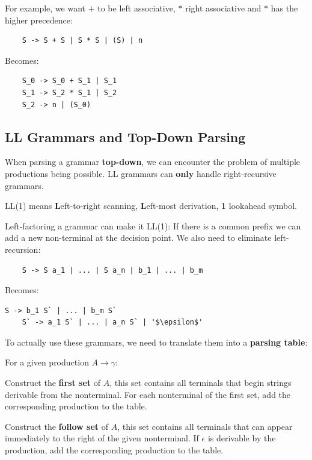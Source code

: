 For example, we want $+$ to be left associative, $*$ right associative and $*$ has the higher precedence:\smallskip
\begin{lstlisting}
	S -> S + S | S * S | (S) | n
\end{lstlisting} \smallskip

Becomes:\smallskip

\begin{lstlisting}
	S_0 -> S_0 + S_1 | S_1
	S_1 -> S_2 * S_1 | S_2
	S_2 -> n | (S_0)
\end{lstlisting}


\subsection*{LL Grammars and Top-Down Parsing}

When parsing a grammar \textbf{top-down}, we can encounter the problem of multiple productions being possible. LL grammars can \textbf{only} handle right-recursive grammars. \medskip

LL(1) means \textbf{L}eft-to-right scanning, \textbf{L}eft-most derivation, \textbf{1} lookahead symbol. \medskip

Left-factoring a grammar can make it LL(1): If there is a common prefix we can add a new non-terminal at the decision point. We also need to eliminate left-recursion:\smallskip

\begin{lstlisting}
 	S -> S a_1 | ... | S a_n | b_1 | ... | b_m
\end{lstlisting}\smallskip

Becomes:\smallskip

\begin{lstlisting}[escapeinside='']
	S -> b_1 S` | ... | b_m S`		
	S` -> a_1 S` | ... | a_n S` | '$\epsilon$'
\end{lstlisting}\medskip




To actually use these grammars, we need to translate them into a \textbf{parsing table}: \medskip

For a given production $A \to \gamma$:
\begin{compactitem}[$\quad\bullet$]
	\item Construct the \textbf{first set} of $A$, this set contains all terminals that begin strings derivable from the nonterminal. For each nonterminal of the first set, add the corresponding production to the table.

	\item Construct the \textbf{follow set} of $A$, this set contains all terminals that can appear immediately to the right of the given nonterminal. If $\epsilon$ is derivable by the production, add the corresponding production to the table.
\end{compactitem}

